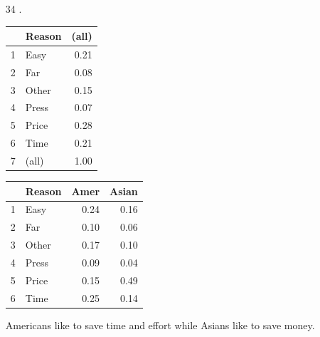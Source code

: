 \documentclass[landscape]{exam}
\begin{document}
\begin{enumerate}
    \item[34].
      \begin{table}[H]
        \centering
        \begin{tabular}{rlr}
          \toprule
                   & Reason & (all) \\
          \midrule
          1        & Easy   & 0.21 \\
          2        & Far    & 0.08 \\
          3        & Other  & 0.15 \\
          4        & Press  & 0.07 \\
          5        & Price  & 0.28 \\
          6        & Time   & 0.21 \\
          7        & (all)  & 1.00 \\
          \bottomrule
        \end{tabular}
      \end{table}

      \begin{table}[H]
        \centering
        \begin{tabular}{rlrr}
          \toprule
                   & Reason & Amer & Asian \\
          \midrule
          1        & Easy   & 0.24 & 0.16 \\
          2        & Far    & 0.10 & 0.06 \\
          3        & Other  & 0.17 & 0.10 \\
          4        & Press  & 0.09 & 0.04 \\
          5        & Price  & 0.15 & 0.49 \\
          6        & Time   & 0.25 & 0.14 \\
          \bottomrule
        \end{tabular}
      \end{table}

      Americans like to save time and effort while Asians like to save money.

  \end{enumerate}
\end{document}
